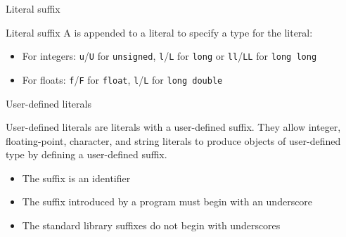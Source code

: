 \begin{frame}{Literal suffix}{}
  \begin{block}{Literal suffix}
    A  is appended to a literal to specify a type for the literal:
    \begin{itemize}
    \item
      For integers: \lstinline!u!/\lstinline!U! for \lstinline!unsigned!, \lstinline!l!/\lstinline!L! for \lstinline!long! or \lstinline!ll!/\lstinline!LL! for \lstinline!long long!
    \item
      For floats: \lstinline!f!/\lstinline!F! for \lstinline!float!, \lstinline!l!/\lstinline!L! for \lstinline!long double!
    \end{itemize}
  \end{block}

  \begin{example}
  \end{example}
\end{frame}

\begin{frame}{User-defined literals}{}
  \begin{block}{User-defined literals}
     are literals with a user-defined suffix. They allow integer, floating-point, character, and string literals to produce objects of user-defined type by defining a user-defined suffix.
    \begin{itemize}
    \item
      The suffix is an identifier
    \item
      The suffix introduced by a program must begin with an underscore
    \item
      The standard library suffixes do not begin with underscores
    \end{itemize}
  \end{block}

  \begin{example}
  \end{example}
\end{frame}

